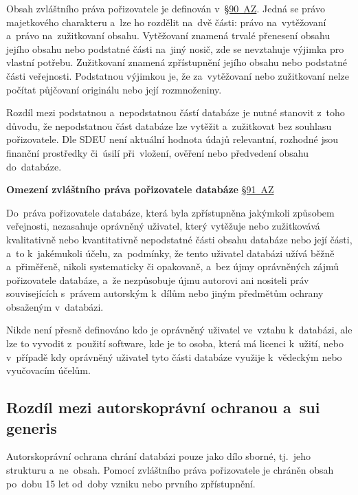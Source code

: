 Obsah zvláštního práva pořizovatele je definován v~\href{https://www.zakonyprolidi.cz/cs/2000-121#p90}{§90~AZ}. Jedná se právo majetkového charakteru a~lze ho rozdělit na~dvě části: právo na~vytěžovaní a~právo na~zužitkovaní obsahu. Vytěžovaní znamená trvalé přenesení obsahu jejího obsahu nebo podstatné části na~jiný nosič, zde se nevztahuje výjimka pro vlastní potřebu. Zužitkovaní znamená zpřístupnění jejího obsahu nebo podstatné části veřejnosti. Podstatnou výjimkou je, že za~vytěžovaní nebo zužitkovaní nelze počítat půjčovaní originálu nebo její rozmnoženiny.

Rozdíl mezi podstatnou a~nepodstatnou částí databáze je nutné stanovit z~toho důvodu, že nepodstatnou část databáze lze vytěžit a~zužitkovat bez souhlasu pořizovatele. Dle SDEU není aktuální hodnota údajů relevantní, rozhodné jsou finanční prostředky či~úsilí při~vložení, ověření nebo předvedení obsahu do~databáze.

\textbf{Omezení zvláštního práva pořizovatele databáze} \href{https://www.zakonyprolidi.cz/cs/2000-121#p91}{§91~AZ}

Do~práva pořizovatele databáze, která byla zpřístupněna jakýmkoli způsobem veřejnosti, nezasahuje oprávněný uživatel, který vytěžuje nebo zužitkovává kvalitativně nebo kvantitativně nepodstatné části obsahu databáze nebo její části, a~to k~jakémukoli účelu, za~podmínky, že tento uživatel databázi užívá běžně a~přiměřeně, nikoli systematicky či opakovaně, a~bez újmy oprávněných zájmů pořizovatele databáze, a~že nezpůsobuje újmu autorovi ani nositeli práv souvisejících s~právem autorským k~dílům nebo jiným předmětům ochrany obsaženým v~databázi.

Nikde není přesně definováno kdo je oprávněný uživatel ve~vztahu k~databázi, ale lze to vyvodit z~použití software, kde je to osoba, která má licenci k~užití, nebo v~případě kdy oprávněný uživatel tyto části databáze využije k~vědeckým nebo vyučovacím účelům.

\subsection{Rozdíl mezi autorskoprávní ochranou a~sui generis}

Autorskoprávní ochrana chrání databázi pouze jako dílo sborné, tj.~jeho strukturu a~ne~obsah. Pomocí zvláštního práva pořizovatele je chráněn obsah po~dobu 15 let od~doby vzniku nebo prvního zpřístupnění.

